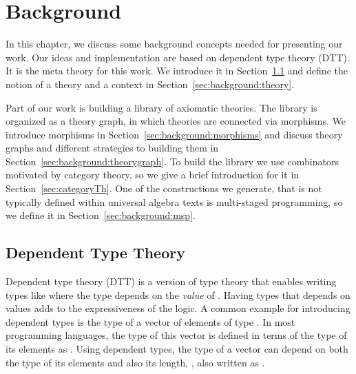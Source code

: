 \chapter{Background}
\label{ch:background}
In this chapter, we discuss some background concepts needed for presenting our work. 
Our ideas and implementation are based on dependent type theory (DTT). It is the meta theory for this work. We introduce it in Section~\ref{subsec:background:dtt} and define the notion of a theory and a context in Section~\ref{sec:background:theory}.

Part of our work is building a library of axiomatic theories. The library is organized as a theory graph, in which theories are connected via morphisms. We introduce morphisms in Section~\ref{sec:background:morphisms} and discuss theory graphs and different strategies to building them in Section~\ref{sec:background:theorygraph}. 
To build the library we use combinators motivated by category theory, so we give a brief introduction for it in Section~\ref{sec:categoryTh}. 
One of the constructions we generate, that is not typically defined within universal algebra texts is multi-staged programming, so we define it in Section~\ref{sec:background:msp}. 

\section{Dependent Type Theory}
\label{subsec:background:dtt}
Dependent type theory (DTT) is a version of type theory that enables writing types like  where the type  depends on the \emph{value} of . 
Having types that depends on values adds to the expressiveness of the logic. A common example for introducing dependent types is the type of a vector of  elements of type . 
In most programming languages, the type of this vector is defined in terms of the type of its elements as . Using dependent types, the type of a vector can depend on both the type of its elements and also its length, , also written as .
 
